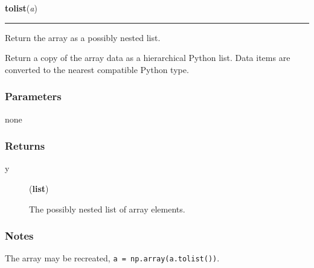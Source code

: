     \label{numpy:ndarray:tolist}

    \vspace{0.5ex}

    \begin{boxedminipage}{\textwidth}

    \raggedright \textbf{tolist}(\textit{a})

    \vspace{-1.5ex}

    \rule{\textwidth}{0.5\fboxrule}

Return the array as a possibly nested list.

Return a copy of the array data as a hierarchical Python list.
Data items are converted to the nearest compatible Python type.



\hypertarget{parameters}{}
\subsubsection*{Parameters}

none



\hypertarget{returns}{}
\subsubsection*{Returns}
\begin{description}
\item[{y}] (\textbf{list})

The possibly nested list of array elements.

\end{description}



\hypertarget{notes}{}
\subsubsection*{Notes}

The array may be recreated, \texttt{a = np.array(a.tolist())}.



\end{boxedminipage}
